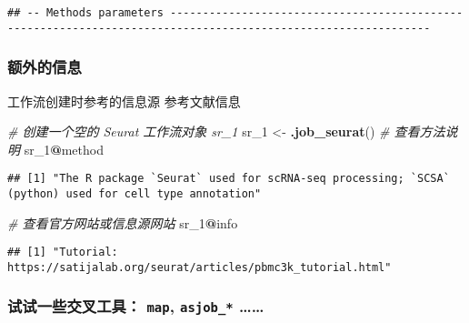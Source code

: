 \documentclass[
]{article}
\newenvironment{Shaded}{\begin{snugshade}}{\end{snugshade}}
\newcommand{\CommentTok}[1]{\textcolor[rgb]{0.56,0.35,0.01}{\textit{#1}}}
\newcommand{\DecValTok}[1]{\textcolor[rgb]{0.00,0.00,0.81}{#1}}
\newcommand{\KeywordTok}[1]{\textcolor[rgb]{0.13,0.29,0.53}{\textbf{#1}}}
\newcommand{\NormalTok}[1]{#1}
\newcommand{\OperatorTok}[1]{\textcolor[rgb]{0.81,0.36,0.00}{\textbf{#1}}}
\newcommand{\StringTok}[1]{\textcolor[rgb]{0.31,0.60,0.02}{#1}}
\begin{document}
\begin{verbatim}
## -- Methods parameters --------------------------------------------------------------------------------------------------------------
\end{verbatim}

\hypertarget{ux989dux5916ux7684ux4fe1ux606f}{%
\subsubsection{额外的信息}\label{ux989dux5916ux7684ux4fe1ux606f}}

工作流创建时参考的信息源
参考文献信息

\begin{Shaded}
\begin{Highlighting}[]
\CommentTok{\# 创建一个空的 Seurat 工作流对象 \textquotesingle{}sr\_1\textquotesingle{}}
\NormalTok{sr\_}\DecValTok{1}\NormalTok{ \textless{}{-}}\StringTok{ }\KeywordTok{.job\_seurat}\NormalTok{()}
\CommentTok{\# 查看方法说明}
\NormalTok{sr\_}\DecValTok{1}\OperatorTok{@}\NormalTok{method}
\end{Highlighting}
\end{Shaded}

\begin{verbatim}
## [1] "The R package `Seurat` used for scRNA-seq processing; `SCSA` (python) used for cell type annotation"
\end{verbatim}

\begin{Shaded}
\begin{Highlighting}[]
\CommentTok{\# 查看官方网站或信息源网站}
\NormalTok{sr\_}\DecValTok{1}\OperatorTok{@}\NormalTok{info}
\end{Highlighting}
\end{Shaded}

\begin{verbatim}
## [1] "Tutorial: https://satijalab.org/seurat/articles/pbmc3k_tutorial.html"
\end{verbatim}

\hypertarget{ux8bd5ux8bd5ux4e00ux4e9bux4ea4ux53c9ux5de5ux5177-map-asjob_}{%
\subsubsection{\texorpdfstring{试试一些交叉工具： \texttt{map}, \texttt{asjob\_*} \ldots\ldots{}}{试试一些交叉工具： map, asjob\_* \ldots\ldots{}}}\label{ux8bd5ux8bd5ux4e00ux4e9bux4ea4ux53c9ux5de5ux5177-map-asjob_}}
\end{document}

